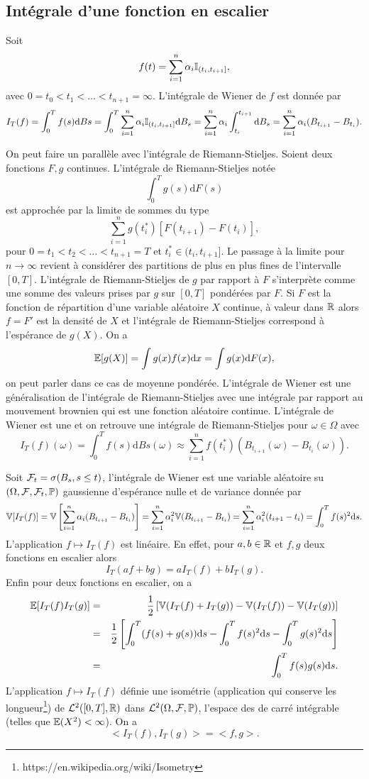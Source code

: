 \subsection{Intégrale d'une fonction en escalier}\label{eq:esc}
Soit 
$$
f(t) = \sum_{i=1}^n\alpha_i\mathbb{I}_{(t_i, t_{i+1}]},
$$
avec $0=t_0<t_1<\ldots <t_{n+1} = \infty$. L'intégrale de Wiener de $f$ est donnée par 
$$
I_T(f) = \int_0^Tf(s)\text{d}Bs = \int_0^T\sum_{i=1}^n\alpha_i\mathbb{I}_{(t_i, t_{i+1}]}\text{d}B_s = \sum_{i=1}^n\alpha_i\int_{t_i}^{t_{i+1}} \text{d}B_s = \sum_{i=1}^n\alpha_i (B_{t_{i+1}} - B_{t_i}).
$$
\begin{remark}
On peut faire un parallèle avec l'intégrale de Riemann-Stieljes. Soient deux fonctions $F, g$ continues. L'intégrale de Riemann-Stieljes notée 
$$
\int_0^Tg(s)\text{d}F(s)
$$
est approchée par la limite de sommes du type
$$
\sum_{i=1}^{n}g(t_i^\ast)[F(t_{i+1})-F(t_{i})],
$$
pour $0=t_1<t_2<\ldots < t_{n+1} = T$ et $t_i^\ast\in(t_i,t_{i+1}]$. Le passage à la limite pour $n\rightarrow \infty$ revient à considérer des partitions de plus en plus fines de l'intervalle $[0,T]$. L'intégrale de Riemann-Stieljes de $g$ par rapport à $F$ s'interprète comme une somme des valeurs prises par $g$ sur $[0,T]$ pondérées par $F$. Si $F$ est la fonction de répartition d'une variable aléatoire $X$ continue, à valeur dans $\mathbb{R}$ alors $f=F'$ est la densité de $X$ et l'intégrale de Riemann-Stieljes correspond à l'espérance de $g(X)$. On a 
$$
\mathbb{E}[g(X)] = \int g(x)f(x)\text{d}x=\int g(x)\text{d}F(x),
$$
on peut parler dans ce cas de moyenne pondérée. L'intégrale de Wiener est une généralisation de l'intégrale de Riemann-Stieljes avec une intégrale par rapport au mouvement brownien qui est une fonction aléatoire continue. L'intégrale de Wiener est une \va et on retrouve une intégrale de Riemann-Stieljes pour $\omega\in\Omega$ avec 
$$
I_T(f)(\omega) =\int_0^Tf(s)\text{d}Bs(\omega) \approx \sum_{i=1}^nf(t_{i}^\ast) (B_{t_{i+1}}(\omega) - B_{t_i}(\omega)).
$$
\end{remark}
Soit $\mathcal{F}_t = \sigma(B_s,s\leq t)$, l'intégrale de Wiener est une variable aléatoire su $(\Omega, \mathcal{F},\mathcal{F}_t, \mathbb{P} )$ gaussienne d'espérance nulle et de variance donnée par
$$
\mathbb{V}[I_T(f)]= \mathbb{V}\left[\sum_{i=1}^n\alpha_i (B_{t_{i+1}} - B_{t_i})\right] = \sum_{i=1}^n\alpha_i^2 \mathbb{V}(B_{t_{i+1}} - B_{t_i}) = \sum_{i=1}^n\alpha_i^2 (t_{i+1} - t_i)= \int_0^T f(s)^2\text{d}s.
$$
L'application $f\mapsto I_T(f)$ est linéaire. En effet, pour $a,b\in \mathbb{R}$ et $f,g$ deux fonctions en escalier alors 
$$
I_T(af+bg) = aI_T(f)+ bI_T(g).
$$
Enfin pour deux fonctions en escalier, on a 
\begin{eqnarray*}
\mathbb{E}[I_T(f)I_T(g)] &=& \frac{1}{2}\left[\mathbb{V}(I_T(f)+I_T(g))-\mathbb{V}(I_T(f))- \mathbb{V}(I_T(g))\right]\\
&=& \frac{1}{2}\left[\int_0^T(f(s)+g(s))\text{d}s-\int_0^Tf(s)^2\text{d}s- \int_0^Tg(s)^2\text{d}s\right]\\
&=&\int_0^Tf(s)g(s)\text{d}s.
\end{eqnarray*}
L'application $f\mapsto I_T(f)$ définie une isométrie (application qui conserve les longueur\footnote{https://en.wikipedia.org/wiki/Isometry}) de $\mathcal{L}^2([0,T],\mathbb{R})$ dans $\mathcal{L}^2(\Omega,\mathcal{F},\mathbb{P})$, l'espace des \va de carré intégrable (telles que $\mathbb{E}(X^2)<\infty$). On a 
$$
<I_T(f), I_T(g)> = <f,g>.
$$
